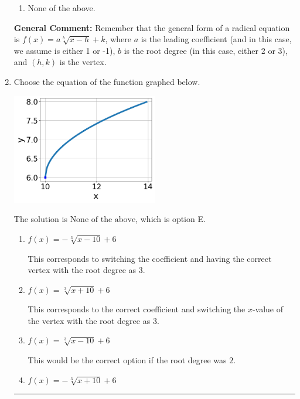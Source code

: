 \documentclass{extbook}[14pt]
\newcommand{\litem}[1]{\item #1

\rule{\textwidth}{0.4pt}}
\begin{document}
\begin{enumerate}
{\begin{enumerate}[label=\Alph*.]
\item None of the above.\end{enumerate}
\textbf{General Comment:} Remember that the general form of a radical equation is $ f(x) = a \sqrt[b]{x - h} + k $, where $a$ is the leading coefficient (and in this case, we assume is either 1 or -1), $b$ is the root degree (in this case, either 2 or 3), and $(h, k)$ is the vertex.
}
\litem{
Choose the equation of the function graphed below.

\begin{center}
    \includegraphics[width=0.5\textwidth]{../Figures/radicalGraphToEquationCopyC.png}
\end{center}


The solution is \( \text{None of the above} \), which is option E.\begin{enumerate}[label=\Alph*.]
\item \( f(x) = - \sqrt[3]{x - 10} + 6 \)

This corresponds to switching the coefficient and having the correct vertex with the root degree as $3$.
\item \( f(x) = \sqrt[3]{x + 10} + 6 \)

This corresponds to the correct coefficient and switching the $x$-value of the vertex with the root degree as $3$.
\item \( f(x) = \sqrt[3]{x - 10} + 6 \)

This would be the correct option if the root degree was $2$.
\item \( f(x) = - \sqrt[3]{x + 10} + 6 \)


\end{enumerate}}
\end{enumerate}
\end{document}
